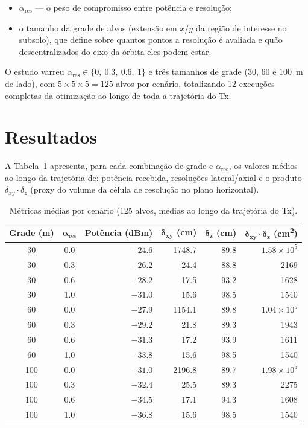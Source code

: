\documentclass[11pt, a4paper]{article}
\newcommand{\dxy}{\delta_{xy}}
\newcommand{\dz}{\delta_z}
\newcommand{\alphares}{\alpha_{\mathrm{res}}}
\begin{document}
\begin{itemize}
  \item $\alphares$ --- o peso de compromisso entre potência e resolução;
  \item o tamanho da grade de alvos (extensão em $x$/$y$ da região de interesse
        no subsolo), que define sobre quantos pontos a resolução é avaliada e
        quão descentralizados do eixo da órbita eles podem estar.
\end{itemize}

O estudo varreu $\alphares \in \{0,\ 0.3,\ 0.6,\ 1\}$ e três tamanhos de grade
($30$, $60$ e $100$~m de lado), com $5\times5\times5 = 125$ alvos por cenário,
totalizando 12 execuções completas da otimização ao longo de toda a trajetória
do Tx.

\section{Resultados}

A Tabela~\ref{tab:resumo} apresenta, para cada combinação de grade e
$\alphares$, os valores médios ao longo da trajetória de: potência recebida,
resoluções lateral/axial e o produto $\dxy\cdot\dz$ (proxy do volume da célula
de resolução no plano horizontal).

\begin{table}[H]
  \centering
  \caption{Métricas médias por cenário (125 alvos, médias ao longo da trajetória do Tx).}
  \label{tab:resumo}
  \small
  \begin{tabular}{@{}ccrrrr@{}}
    \toprule
    \textbf{Grade (m)} & $\boldsymbol{\alphares}$ &
    \textbf{Potência (dBm)} & $\boldsymbol{\dxy}$\textbf{ (cm)} &
    $\boldsymbol{\dz}$\textbf{ (cm)} & $\boldsymbol{\dxy\!\cdot\!\dz}$\textbf{ (cm\textsuperscript{2})} \\
    \midrule
    30  & 0.0 & $-24.6$ & 1748.7 & 89.8 & $1.58\times10^{5}$ \\
    30  & 0.3 & $-26.2$ & 24.4   & 88.8 & 2169 \\
    30  & 0.6 & $-28.2$ & 17.5   & 93.2 & 1628 \\
    30  & 1.0 & $-31.0$ & 15.6   & 98.5 & 1540 \\
    \midrule
    60  & 0.0 & $-27.9$ & 1154.1 & 89.8 & $1.04\times10^{5}$ \\
    60  & 0.3 & $-29.2$ & 21.8   & 89.3 & 1943 \\
    60  & 0.6 & $-31.3$ & 17.2   & 93.9 & 1611 \\
    60  & 1.0 & $-33.8$ & 15.6   & 98.5 & 1540 \\
    \midrule
    100 & 0.0 & $-31.0$ & 2196.8 & 89.7 & $1.98\times10^{5}$ \\
    100 & 0.3 & $-32.4$ & 25.5   & 89.3 & 2275 \\
    100 & 0.6 & $-34.5$ & 17.1   & 94.3 & 1608 \\
    100 & 1.0 & $-36.8$ & 15.6   & 98.5 & 1540 \\
    \bottomrule
  \end{tabular}
\end{table}
\end{document}
